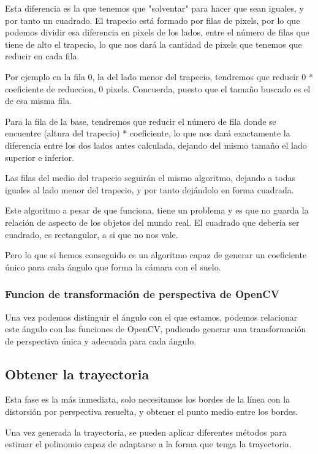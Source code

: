 Esta diferencia es la que tenemos que "solventar" para hacer que sean iguales, y por tanto un cuadrado. 
El trapecio está formado por filas de pixels, por lo que podemos dividir esa diferencia en pixels de los lados, entre el número de filas que tiene de alto el trapecio, lo que nos dará la cantidad de pixels que tenemos que reducir en cada fila.

Por ejemplo en la fila 0, la del lado menor del trapecio, tendremos que reducir 0 * coeficiente de reduccion, 0 pixels. Concuerda, puesto que el tamaño buscado es el de esa misma fila.

Para la fila de la base, tendremos que reducir el número de fila donde se encuentre (altura del trapecio) * coeficiente, lo que nos dará exactamente la diferencia entre los dos lados antes calculada, dejando del mismo tamaño el lado superior e inferior.

Las filas del medio del trapecio seguirán el mismo algoritmo, dejando a todas iguales al lado menor del trapecio, y por tanto dejándolo en forma cuadrada.

Este algoritmo a pesar de que funciona, tiene un problema y es que no guarda la relación de aspecto de los objetos del mundo real. El cuadrado que debería ser cuadrado, es rectangular, a si que no nos vale.

Pero lo que si hemos conseguido es un algoritmo capaz de generar un coeficiente único para cada ángulo que forma la cámara con el suelo.

\subsubsection{Funcion de transformación de perspectiva de OpenCV}

Una vez podemos distinguir el ángulo con el que estamos, podemos relacionar este ángulo con las funciones de OpenCV, pudiendo generar una transformación de perspectiva única y adecuada para cada ángulo.

\subsection{Obtener la trayectoria}
Esta fase es la más inmediata, solo necesitamos los bordes de la línea con la distorsión por perspectiva resuelta, y obtener el punto medio entre los bordes.

Una vez generada la trayectoria, se pueden aplicar diferentes métodos para estimar el polinomio capaz de adaptarse a la forma que tenga la trayectoria.


